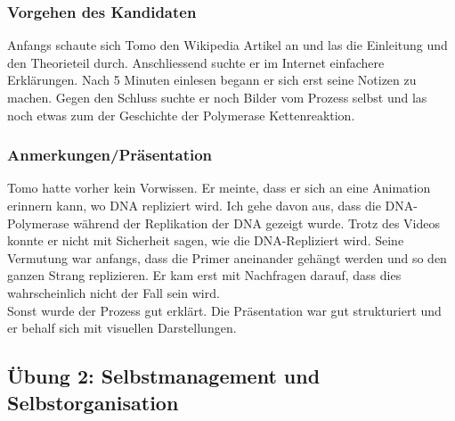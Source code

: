 \subsubsection{Vorgehen des Kandidaten} \label{bemtom}
Anfangs schaute sich Tomo den Wikipedia Artikel an und las die Einleitung und den Theorieteil durch.  Anschliessend suchte er im Internet einfachere Erklärungen. Nach 5 Minuten einlesen begann er sich erst seine Notizen zu machen. Gegen den Schluss suchte er noch Bilder vom Prozess selbst und las noch etwas zum der Geschichte der Polymerase Kettenreaktion.

\subsubsection{Anmerkungen/Präsentation}
Tomo hatte vorher kein Vorwissen. Er meinte, dass er sich an eine Animation erinnern kann, wo DNA repliziert wird. Ich gehe davon aus, dass die DNA-Polymerase während der Replikation der DNA gezeigt wurde. Trotz des Videos konnte er nicht mit Sicherheit sagen, wie die DNA-Repliziert wird. Seine Vermutung war anfangs, dass die Primer aneinander gehängt werden und so den ganzen Strang replizieren. Er kam erst mit Nachfragen darauf, dass dies wahrscheinlich nicht der Fall sein wird. \\
Sonst wurde der Prozess gut erklärt. Die Präsentation war gut strukturiert und er behalf sich mit visuellen Darstellungen.

\subsection{Übung 2: Selbstmanagement und Selbstorganisation}
